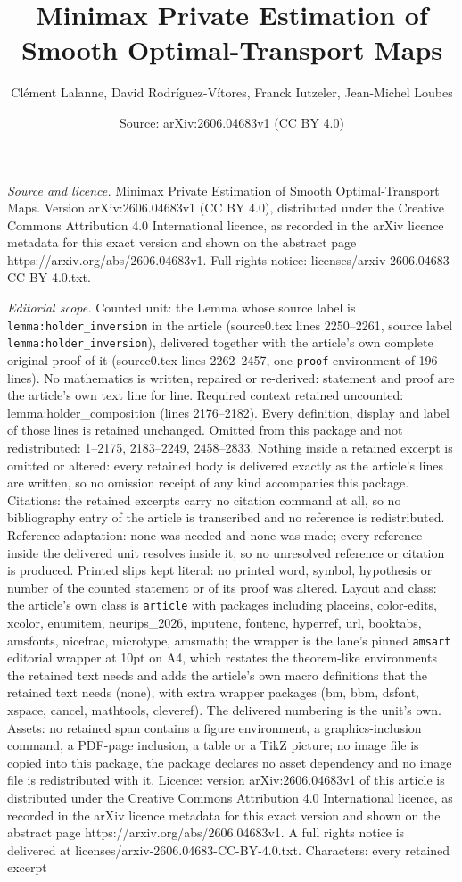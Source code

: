\documentclass[10pt,a4paper]{amsart}
\title[Minimax Private Estimation of Smooth Optimal-Transport Maps]{Minimax Private Estimation of Smooth Optimal-Transport Maps}
\author{Cl\'ement Lalanne, David Rodr\'iguez-V\'itores, Franck Iutzeler, Jean-Michel Loubes}
\date{Source: arXiv:2606.04683v1 (CC BY 4.0)}
\begin{document}
\maketitle

\noindent\emph{Source and licence.} Minimax Private Estimation of Smooth Optimal-Transport Maps. Version arXiv:2606.04683v1 (CC BY 4.0), distributed under the Creative Commons Attribution 4.0 International licence, as recorded in the arXiv licence metadata for this exact version and shown on the abstract page https://arxiv.org/abs/2606.04683v1. Full rights notice: licenses/arxiv-2606.04683-CC-BY-4.0.txt.\par\smallskip

\noindent\textit{Editorial scope.} Counted unit: the Lemma whose source label is \texttt{lemma:holder\_inversion} in the article (source0.tex lines 2250--2261, source label \texttt{lemma:holder\_inversion}), delivered together with the article's own complete original proof of it (source0.tex lines 2262--2457, one \texttt{proof} environment of 196 lines). No mathematics is written, repaired or re-derived: statement and proof are the article's own text line for line. Required context retained uncounted: lemma:holder\_composition (lines 2176--2182). Every definition, display and label of those lines is retained unchanged. Omitted from this package and not redistributed: 1--2175, 2183--2249, 2458--2833. Nothing inside a retained excerpt is omitted or altered: every retained body is delivered exactly as the article's lines are written, so no omission receipt of any kind accompanies this package. Citations: the retained excerpts carry no citation command at all, so no bibliography entry of the article is transcribed and no reference is redistributed. Reference adaptation: none was needed and none was made; every reference inside the delivered unit resolves inside it, so no unresolved reference or citation is produced. Printed slips kept literal: no printed word, symbol, hypothesis or number of the counted statement or of its proof was altered. Layout and class: the article's own class is \texttt{article} with packages including placeins, color-edits, xcolor, enumitem, neurips\_2026, inputenc, fontenc, hyperref, url, booktabs, amsfonts, nicefrac, microtype, amsmath; the wrapper is the lane's pinned \texttt{amsart} editorial wrapper at 10pt on A4, which restates the theorem-like environments the retained text needs and adds the article's own macro definitions that the retained text needs (none), with extra wrapper packages (bm, bbm, dsfont, xspace, cancel, mathtools, cleveref). The delivered numbering is the unit's own. Assets: no retained span contains a figure environment, a graphics-inclusion command, a PDF-page inclusion, a table or a TikZ picture; no image file is copied into this package, the package declares no asset dependency and no image file is redistributed with it. Licence: version arXiv:2606.04683v1 of this article is distributed under the Creative Commons Attribution 4.0 International licence, as recorded in the arXiv licence metadata for this exact version and shown on the abstract page https://arxiv.org/abs/2606.04683v1. A full rights notice is delivered at licenses/arxiv-2606.04683-CC-BY-4.0.txt. Characters: every retained excerpt 
\end{document}
